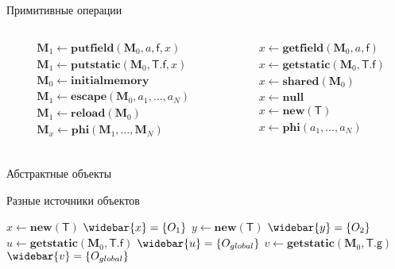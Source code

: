 \documentclass[usenames,dvipsnames,pdftex,unicode,hidelinks]{beamer}
\newcommand{\M}{\ensuremath{\mathbf{M}}}
\newcommand{\type}[1]{\mathsf{#1}}
\newcommand{\field}[1]{\mathsf{#1}}
\newcommand{\sfield}[2]{\type{#1}.\field{#2}}
\newcommand{\op}[1]{\mathbf{#1}}
\newcommand{\pts}[1]{\widebar{#1}}
\begin{document}
\begin{frame}{Примитивные операции}

  \begin{columns}[t]
    \begin{column}{0.5\textwidth}
      \begin{align*}
        &\M_1 \gets \op{putfield}(\M_0, a, \field{f}, x) \\
        &\M_1 \gets \op{putstatic}(\M_0, \sfield{T}{f}, x) \\
        &\M_0 \gets \op{initialmemory } \\
        &\M_1 \gets \op{escape}(\M_0, a_1, \ldots, a_N) \\
        &\M_1 \gets \op{reload}(\M_0) \\
        &\M_x \gets \op{phi}(\M_1, \ldots, \M_N) \\
      \end{align*}
    \end{column}
    \begin{column}{0.5\textwidth}
      \begin{align*}
        &x \gets \op{getfield}(\M_0, a, \field{f}) \\
        &x \gets \op{getstatic}(\M_0, \sfield{T}{f}) \\
        &x \gets \op{shared}(\M_0) \\
        &x \gets \op{null } \\
        &x \gets \op{new}(\type{T}) \\
        &x \gets \op{phi}(a_1, \ldots, a_N) \\
      \end{align*}
    \end{column}
  \end{columns}

\end{frame}

\begin{frame}{Абстрактные объекты}

  \begin{block}{Разные источники объектов}
    \begin{algorithmic}[1]
      \State $x \gets \op{new}(\type{T})$
        \Comment $\pts{x} = \{O_1\}$
      \State $y \gets \op{new}(\type{T})$
        \Comment $\pts{y} = \{O_2\}$
      \State $u \gets \op{getstatic}(\M_0, \sfield{T}{f})$
        \Comment $\pts{u} = \{O_{global}\}$
      \State $v \gets \op{getstatic}(\M_0, \sfield{T}{g})$
        \Comment $\pts{v} = \{O_{global}\}$
    \end{algorithmic}
  \end{block}

\end{frame}
\end{document}
